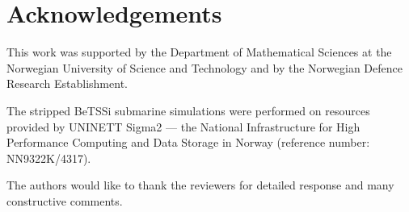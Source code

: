 \section*{Acknowledgements}
This work was supported by the Department of Mathematical Sciences at the Norwegian University of Science and Technology and by the Norwegian Defence Research Establishment.

The stripped BeTSSi submarine simulations were performed on resources provided by UNINETT Sigma2 --- the National Infrastructure
for High Performance Computing and Data Storage in Norway (reference number: NN9322K/4317).

The authors would like to thank the reviewers for detailed response and many constructive comments.
